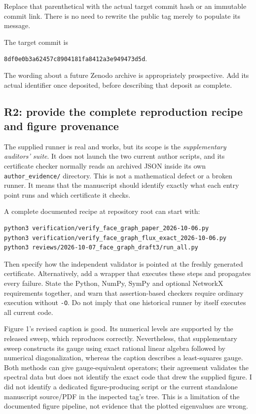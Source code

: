 \documentclass[11pt,a4paper]{article}
\begin{document}
Replace that parenthetical with the actual target commit hash or an immutable commit link. There is no need to rewrite the public tag merely to populate its message. \begin{samepage}The target commit is
\begin{center}\small\texttt{8df0e0b3a62457c8904181fa8412a3e949473d5d}.\end{center}\end{samepage}
The wording about a future Zenodo archive is appropriately prospective. Add its actual identifier once deposited, before describing that deposit as complete.

\subsection{R2: provide the complete reproduction recipe and figure provenance}
The supplied runner is real and works, but its scope is the \emph{supplementary auditors' suite}. It does not launch the two current author scripts, and its certificate checker normally reads an archived JSON inside its own \texttt{author\_evidence/} directory. This is not a mathematical defect or a broken runner. It means that the manuscript should identify exactly what each entry point runs and which certificate it checks.

A complete documented recipe at repository root can start with:
\begin{verbatim}
python3 verification/verify_face_graph_paper_2026-10-06.py
python3 verification/verify_face_graph_flux_exact_2026-10-06.py
python3 reviews/2026-10-07_face_graph_draft3/run_all.py
\end{verbatim}
Then specify how the independent validator is pointed at the freshly generated certificate. Alternatively, add a wrapper that executes these steps and propagates every failure. State the Python, NumPy, SymPy and optional NetworkX requirements together, and warn that assertion-based checkers require ordinary execution without \texttt{-O}. Do not imply that one historical runner by itself executes all current code.

Figure 1's revised caption is good. Its numerical levels are supported by the released sweep, which reproduces correctly. Nevertheless, that supplementary sweep constructs its gauge using exact rational linear algebra followed by numerical diagonalization, whereas the caption describes a least-squares gauge. Both methods can give gauge-equivalent operators; their agreement validates the spectral data but does not identify the exact code that drew the supplied figure. I did not identify a dedicated figure-producing script or the current standalone manuscript source/PDF in the inspected tag's tree. This is a limitation of the documented figure pipeline, not evidence that the plotted eigenvalues are wrong.
\end{document}
